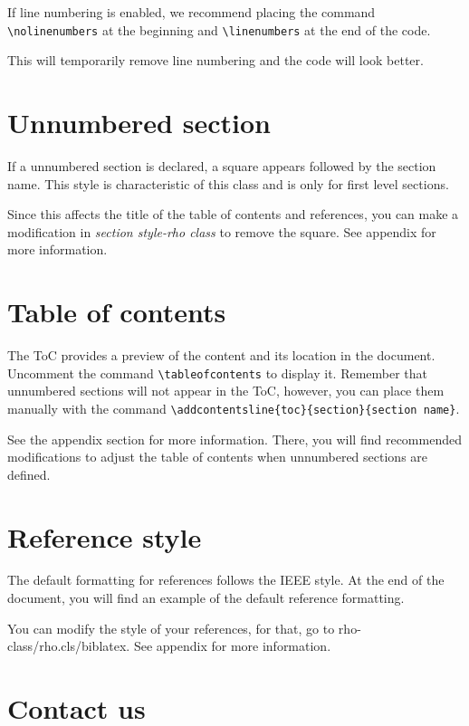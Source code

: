 \documentclass[9pt,a4paper,twoside]{rho-class/rho}
\begin{document}
    If line numbering is enabled, we recommend placing the command \verb|\nolinenumbers| at the beginning and \verb|\linenumbers| at the end of the code. 
    
    This will temporarily remove line numbering and the code will look better.

\section*{Unnumbered section} \label{sec:unsec}

    If a unnumbered section is declared, a square appears followed by the section name. This style is characteristic of this class and is only for first level sections.

    Since this affects the title of the table of contents and references, you can make a modification in \textit{section style-rho class} to remove the square. See appendix for more information.

\section{Table of contents}

    The ToC provides a preview of the content and its location in the document. Uncomment the command \verb|\tableofcontents| to display it. Remember that unnumbered sections will not appear in the ToC, however, you can place them manually with the command \verb|\addcontentsline{toc}{section}{section name}|.

    See the appendix section for more information. There, you will find recommended modifications to adjust the table of contents when unnumbered sections are defined.

\section{Reference style}

    The default formatting for references follows the IEEE style. At the end of the document, you will find an example of the default reference formatting.

    You can modify the style of your references, for that, go to rho-class/rho.cls/biblatex. See appendix for more information.

\section{Contact us}
\end{document}
